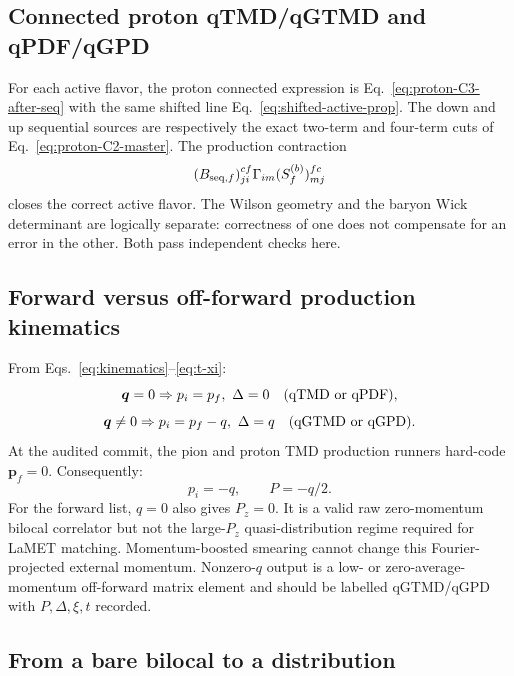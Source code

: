 \documentclass[11pt,a4paper]{article}
\numberwithin{equation}{section}
\begin{document}
\subsection{Connected proton qTMD/qGTMD and qPDF/qGPD}

For each active flavor, the proton connected expression is
Eq.~\eqref{eq:proton-C3-after-seq} with the same shifted line
Eq.~\eqref{eq:shifted-active-prop}.  The down and up sequential sources are
respectively the exact two-term and four-term cuts of
Eq.~\eqref{eq:proton-C2-master}.  The production contraction
\begin{equation}
 (B_{{\rm seq},f})_{ji}^{cf}
 \Gamma_{im}
 (S_f^{(b)})_{mj}^{fc}
\end{equation}
closes the correct active flavor.  The Wilson geometry and the baryon Wick
determinant are logically separate: correctness of one does not compensate
for an error in the other.  Both pass independent checks here.

\subsection{Forward versus off-forward production kinematics}

From Eqs.~\eqref{eq:kinematics}--\eqref{eq:t-xi}:
\begin{equation}
 \boldsymbol q=0
 \Rightarrow p_i=p_f,\ \Delta=0
 \quad\hbox{(qTMD or qPDF)},
\end{equation}
\begin{equation}
 \boldsymbol q\neq0
 \Rightarrow p_i=p_f-q,\ \Delta=q
 \quad\hbox{(qGTMD or qGPD)}.
\end{equation}
At the audited commit, the pion and proton TMD production runners hard-code
\(\boldsymbol p_f=0\).  Consequently:
\begin{equation}
 p_i=-q,\qquad P=-q/2.
\end{equation}
For the forward list, \(q=0\) also gives \(P_z=0\).  It is a valid raw
zero-momentum bilocal correlator but not the large-\(P_z\) quasi-distribution
regime required for LaMET matching.  Momentum-boosted smearing cannot change
this Fourier-projected external momentum.  Nonzero-\(q\) output is a low- or
zero-average-momentum off-forward matrix element and should be labelled
qGTMD/qGPD with \(P,\Delta,\xi,t\) recorded.

\subsection{From a bare bilocal to a distribution}
\end{document}
